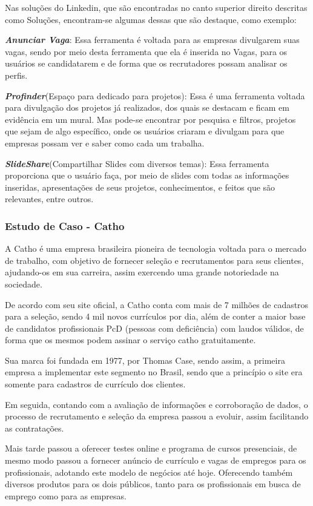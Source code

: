 Nas soluções do Linkedin, que são encontradas no canto superior direito descritas como Soluções, encontram-se algumas dessas que são destaque, como exemplo:

\textbf{\emph{Anunciar Vaga}}: Essa ferramenta é voltada para as empresas divulgarem suas vagas, sendo por meio desta ferramenta que ela é inserida no Vagas, para os usuários se candidatarem e de forma que os recrutadores possam analisar os perfis. 

\textbf{\emph{Profinder}}(Espaço para dedicado para projetos): Essa é uma ferramenta voltada para divulgação dos projetos já realizados, dos quais se destacam e ficam em evidência em um mural. Mas pode-se encontrar por pesquisa e filtros, projetos que sejam de algo específico, onde os usuários criaram e divulgam para que empresas possam ver e saber como cada um trabalha.

\textbf{\emph{SlideShare}}(Compartilhar Slides com diversos temas): Essa ferramenta proporciona que o usuário faça, por meio de slides com todas as informações inseridas, apresentações de seus projetos, conhecimentos, e feitos que são relevantes, entre outros.

\subsubsection{Estudo de Caso - Catho}

A Catho é uma empresa brasileira pioneira de tecnologia voltada para o mercado de trabalho, com objetivo de fornecer seleção e recrutamentos para seus clientes, ajudando-os em sua carreira, assim exercendo uma grande notoriedade na sociedade.

De acordo com seu site oficial, a Catho conta com mais de 7 milhões de cadastros para a seleção, sendo 4 mil novos currículos por dia, além de conter a maior base de candidatos profissionais PcD (pessoas com deficiência) com laudos válidos, de forma que os mesmos podem assinar o serviço catho gratuitamente.

Sua marca foi fundada em 1977, por Thomas Case, sendo assim, a primeira empresa a implementar este segmento no Brasil, sendo que a princípio o site era somente para cadastros de currículo dos clientes.

Em seguida, contando com a avaliação de informações e corroboração de dados, o processo de recrutamento e seleção da empresa passou a evoluir, assim facilitando as contratações.

Mais tarde passou a oferecer testes online e programa de cursos presenciais, de mesmo modo passou a fornecer anúncio de currículo e vagas de empregos para os profissionais, adotando este modelo de negócios até hoje. Oferecendo também diversos produtos para os dois públicos, tanto para os profissionais em busca de emprego como para as empresas.

